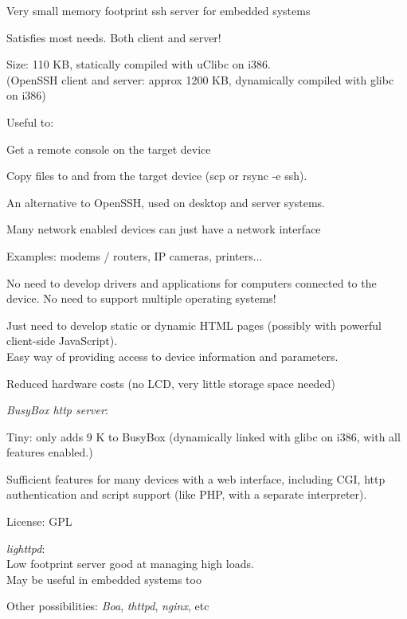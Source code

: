   \startitemize
  \item Very small memory footprint ssh server for embedded systems
  \item Satisfies most needs. Both client and server!
  \item Size: 110 KB, statically compiled with uClibc on i386.\\
    (OpenSSH client and server: approx 1200 KB, dynamically compiled
    with glibc on i386)
  \item Useful to:
    \startitemize
    \item Get a remote console on the target device
    \item Copy files to and from the target device (scp or rsync -e
      ssh).
    \stopitemize
  \item An alternative to OpenSSH, used on desktop and server systems.
  \stopitemize


  Many network enabled devices can just have a network interface

  \startitemize
  \item Examples: modems / routers, IP cameras, printers...
  \item No need to develop drivers and applications for computers
    connected to the device. No need to support multiple operating
    systems!
  \item Just need to develop static or dynamic HTML pages (possibly
    with powerful client-side JavaScript).\\
    Easy way of providing access to device information and parameters.
  \item Reduced hardware costs (no LCD, very little storage space
    needed)
  \stopitemize

    \startitemize
    \item {\em BusyBox http server}: 
      \startitemize
      \item Tiny: only adds 9 K to BusyBox (dynamically linked with
        glibc on i386, with all features enabled.)
      \item Sufficient features for many devices with a web interface,
        including CGI, http authentication and script support (like
        PHP, with a separate interpreter).
      \item License: GPL
      \stopitemize
    \item {\em lighttpd}: \\
      Low footprint server good at managing high loads.\\
      May be useful in embedded systems too
    \item Other possibilities: {\em Boa}, {\em thttpd}, {\em nginx},
      etc
    \stopitemize

